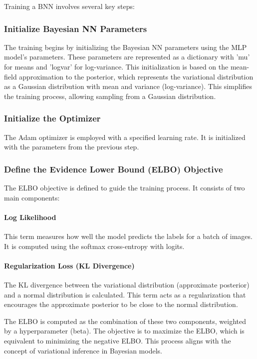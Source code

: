 \documentclass{article}
\begin{document}
Training a BNN involves several key steps:

\subsubsection{Initialize Bayesian NN Parameters}
The training begins by initializing the Bayesian NN parameters using the MLP model's parameters. These parameters are represented as a dictionary with 'mu' for means and 'logvar' for log-variance. This initialization is based on the mean-field approximation to the posterior, which represents the variational distribution as a Gaussian distribution with mean and variance (log-variance). This simplifies the training process, allowing sampling from a Gaussian distribution.

\subsubsection{Initialize the Optimizer}
The Adam optimizer is employed with a specified learning rate. It is initialized with the parameters from the previous step.

\subsubsection{Define the Evidence Lower Bound (ELBO) Objective}
The ELBO objective is defined to guide the training process. It consists of two main components:

\paragraph{Log Likelihood}
This term measures how well the model predicts the labels for a batch of images. It is computed using the softmax cross-entropy with logits.

\paragraph{Regularization Loss (KL Divergence)}
The KL divergence between the variational distribution (approximate posterior) and a normal distribution is calculated. This term acts as a regularization that encourages the approximate posterior to be close to the normal distribution.

The ELBO is computed as the combination of these two components, weighted by a hyperparameter (beta). The objective is to maximize the ELBO, which is equivalent to minimizing the negative ELBO. This process aligns with the concept of variational inference in Bayesian models.
\end{document}
